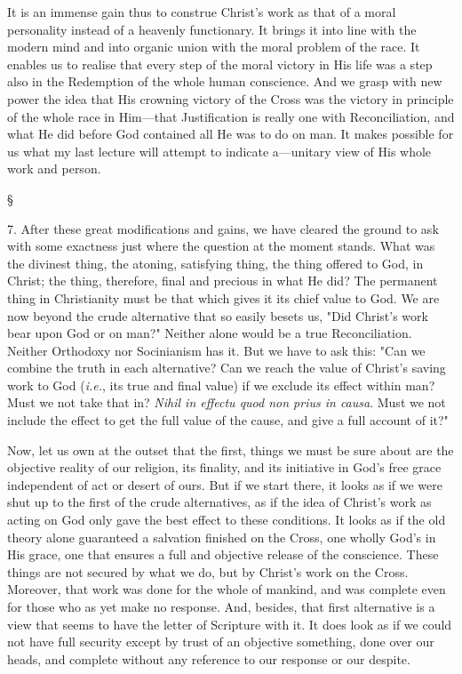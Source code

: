 \documentclass[12pt,a5paper,twoside,titlepage]{book}
\begin{document}
It is an immense gain thus to construe 
Christ's work as that of a moral personality 
instead of a heavenly functionary. It brings 
it into line with the modern mind and into 
organic union with the moral problem of 
the race. It enables us to realise that every 
step of the moral victory in His life was a step 
also in the Redemption of the whole human 
conscience. And we grasp with new power the 
idea that His crowning victory of the Cross was 
the victory in principle of the whole race in 
Him---that Justification is really one with Reconciliation, 
and what He did before God contained 
all He was to do on man. It makes 
possible for us what my last lecture will attempt 
to indicate a---unitary view of His whole work 
and person. 

\begin{center}
\S
\end{center}

7. After these great modifications and gains, 
we have cleared the ground to ask with some 
exactness just where the question at the moment 
stands. What was the divinest thing, the atoning, 
satisfying thing, the thing offered to God, in 
Christ; the thing, therefore, final and precious in 
what He did? The permanent thing in Christianity 
must be that which gives it its chief 
value to God. We are now beyond the crude 
alternative that so easily besets us, "Did Christ's 
work bear upon God or on man?" Neither alone 
would be a true Reconciliation. Neither Orthodoxy 
nor Socinianism has it. But we have to ask 
this: "Can we combine the truth in each alternative? 
Can we reach the value of Christ's 
saving work to God (\textit{i.e.}, its true and final value) 
if we exclude its effect within man? Must we 
not take that in? \textit{Nihil in effectu quod non prius 
in causa}. Must we not include the effect to get 
the full value of the cause, and give a full 
account of it?" 

Now, let us own at the outset that the first, 
things we must be sure about are the objective 
reality of our religion, its finality, and its initiative 
in God's free grace independent of act or 
desert of ours. But if we start there, it looks 
as if we were shut up to the first of the crude 
alternatives, as if the idea of Christ's work as 
acting on God only gave the best effect to these 
conditions. It looks as if the old theory alone 
guaranteed a salvation finished on the Cross, one 
wholly God's in His grace, one that ensures a 
full and objective release of the conscience. 
These things are not secured by what we do, but 
by Christ's work on the Cross. Moreover, that 
work was done for the whole of mankind, and 
was complete even for those who as yet make no 
response. And, besides, that first alternative is 
a view that seems to have the letter of Scripture 
with it. It does look as if we could not have full 
security except by trust of an objective something, 
done over our heads, and complete without 
any reference to our response or our 
despite. 
\end{document}
